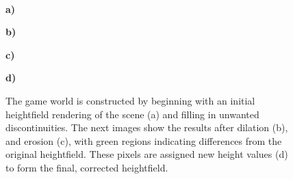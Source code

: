 \documentclass[review]{vgtc}                 %
\begin{document}
\begin{figure}[t]
\begin{center}
  \vspace{-0.2in}\\

\begin{minipage}{\picwidth}\textcolor[rgb]{1,1,1}{\hspace{0.02in} {\bf        a)}} \end{minipage}
 \begin{minipage}{\picwidth}\textcolor[rgb]{1,1,1}{\hspace{0.02in} {\bf        b)}} \end{minipage}
 \begin{minipage}{\picwidth}\textcolor[rgb]{1,1,1}{\hspace{0.02in} {\bf              c)}} \end{minipage}
 \begin{minipage}{\picwidth}\textcolor[rgb]{1,1,1}{\hspace{0.02in} {\bf              d)}} \end{minipage}
 \end{center}
 \vspace{-0.15in}
 \caption[ARmy Game World Model]{The game world is constructed by
   beginning with an initial heightfield rendering of the scene (a)
   and filling in unwanted discontinuities.  
 The next
   images show the results after dilation (b), and erosion (c), with
   green regions indicating differences from the original heightfield.
   These pixels are assigned new height values (d) to form the final,
   corrected heightfield.}
 \label{FIGURE:HeightfieldOperations}
\vspace{-0.1in}
 \end{figure}
\end{document}
